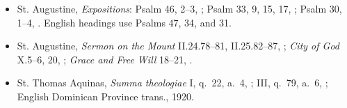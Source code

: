 \begin{deepstudy}
{\begin{itemize}[itemsep=0em,topsep=0.15em,parsep=0pt]
\item St. Augustine, \emph{Expositions}: Psalm 46, 2--3, ; Psalm 33, 9, 15, 17, ; Psalm 30, 1--4, . English headings use Psalms 47, 34, and 31.
\item St. Augustine, \emph{Sermon on the Mount} II.24.78--81, II.25.82--87, ; \emph{City of God} X.5--6, 20, ; \emph{Grace and Free Will} 18--21, .
\item St. Thomas Aquinas, \emph{Summa theologiae} I, q.~22, a.~4, ; III, q.~79, a.~6, ; English Dominican Province trans., 1920.
\end{itemize}
}


\end{deepstudy}
